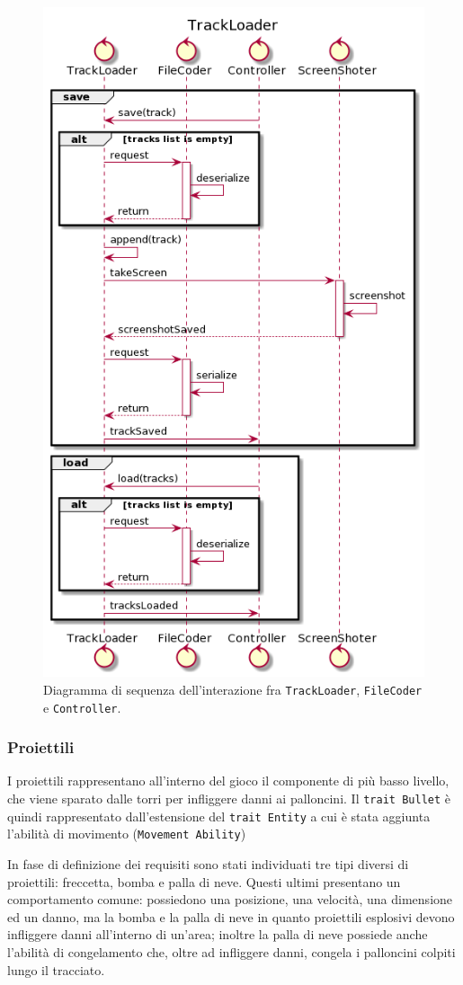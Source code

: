 \begin{figure}[H]
    \centering
    \includegraphics[width=.57\linewidth]{img/sequence-track-loader}
    \caption{Diagramma di sequenza dell'interazione fra \texttt{TrackLoader}, \texttt{FileCoder} e \texttt{Controller}.}
    \label{fig:sequence-track-loader}
\end{figure}



\subsubsection{Proiettili}
I proiettili rappresentano all'interno del gioco il componente di più basso livello, che viene sparato dalle torri
per infliggere danni ai palloncini. Il \texttt{trait Bullet} è quindi rappresentato dall'estensione del
\texttt{trait Entity} a cui è stata aggiunta l'abilità di movimento (\texttt{Movement Ability})

In fase di definizione dei requisiti sono stati individuati tre tipi diversi di proiettili: freccetta, bomba e palla di neve.
Questi ultimi presentano un comportamento comune: possiedono una posizione, una velocità, una dimensione ed un danno, ma
la bomba e la palla di neve in quanto proiettili esplosivi devono infliggere danni all'interno di un'area; inoltre
la palla di neve possiede anche l'abilità di congelamento che, oltre ad infliggere danni, congela i palloncini colpiti
lungo il tracciato.

